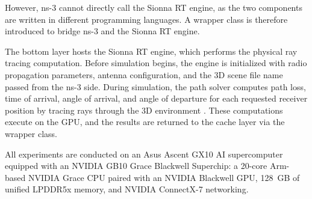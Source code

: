 However, ns-3 cannot directly call the Sionna RT engine, as the two components are written in different programming languages.
A wrapper class is therefore introduced to bridge ns-3 and the Sionna RT engine.

The bottom layer hosts the Sionna RT engine, which performs the physical ray tracing computation.
Before simulation begins, the engine is initialized with radio propagation parameters, antenna configuration, and the 3D scene file name passed from the ns-3 side.
During simulation, the path solver computes path loss, time of arrival, angle of arrival, and angle of departure for each requested receiver position by tracing rays through the 3D environment \cite{sionnart}.
These computations execute on the GPU, and the results are returned to the cache layer via the wrapper class.

All experiments are conducted on an Asus Ascent GX10 AI supercomputer equipped with an NVIDIA GB10 Grace Blackwell Superchip: a 20-core Arm-based NVIDIA Grace CPU paired with an NVIDIA Blackwell GPU, 128~GB of unified LPDDR5x memory, and NVIDIA ConnectX-7 networking.
